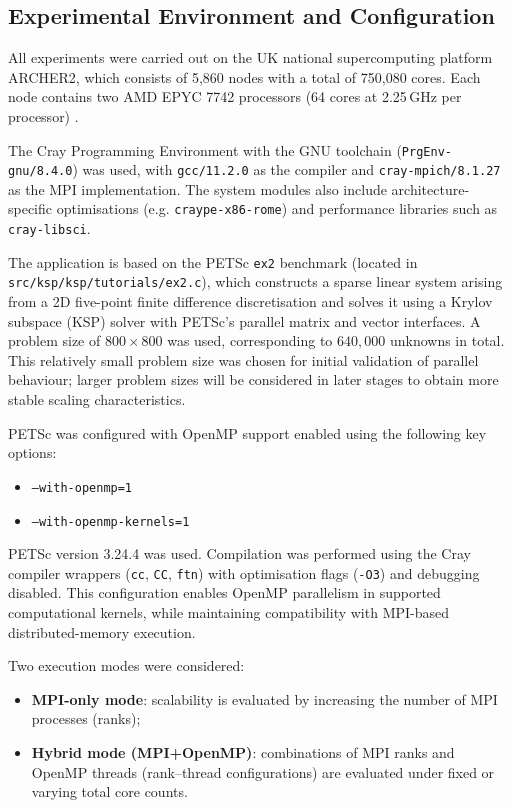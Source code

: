 \documentclass{article}
\begin{document}
\subsection{Experimental Environment and Configuration}

All experiments were carried out on the UK national supercomputing platform ARCHER2, which consists of 5,860 nodes with a total of 750,080 cores. 
Each node contains two AMD EPYC 7742 processors (64 cores at 2.25\,GHz per processor) \cite{archer2_hardware}.

The Cray Programming Environment with the GNU toolchain (\texttt{PrgEnv-gnu/8.4.0}) was used, with \texttt{gcc/11.2.0} as the compiler and \texttt{cray-mpich/8.1.27} as the MPI implementation. 
The system modules also include architecture-specific optimisations (e.g. \texttt{craype-x86-rome}) and performance libraries such as \texttt{cray-libsci}.

The application is based on the PETSc \texttt{ex2} benchmark (located in \texttt{src/ksp/ksp/tutorials/ex2.c}), which constructs a sparse linear system arising from a 2D five-point finite difference discretisation and solves it using a Krylov subspace (KSP) solver with PETSc's parallel matrix and vector interfaces. 
A problem size of $800 \times 800$ was used, corresponding to $640{,}000$ unknowns in total. 
This relatively small problem size was chosen for initial validation of parallel behaviour; larger problem sizes will be considered in later stages to obtain more stable scaling characteristics.

PETSc was configured with OpenMP support enabled using the following key options:

\begin{itemize}
    \item \texttt{--with-openmp=1}
    \item \texttt{--with-openmp-kernels=1}
\end{itemize}
PETSc version 3.24.4 was used.
Compilation was performed using the Cray compiler wrappers (\texttt{cc}, \texttt{CC}, \texttt{ftn}) with optimisation flags (\texttt{-O3}) and debugging disabled. 
This configuration enables OpenMP parallelism in supported computational kernels, while maintaining compatibility with MPI-based distributed-memory execution.

Two execution modes were considered:

\begin{itemize}
    \item \textbf{MPI-only mode}: scalability is evaluated by increasing the number of MPI processes (ranks);
    
    \item \textbf{Hybrid mode (MPI+OpenMP)}: combinations of MPI ranks and OpenMP threads (rank--thread configurations) are evaluated under fixed or varying total core counts.
\end{itemize}
\end{document}
